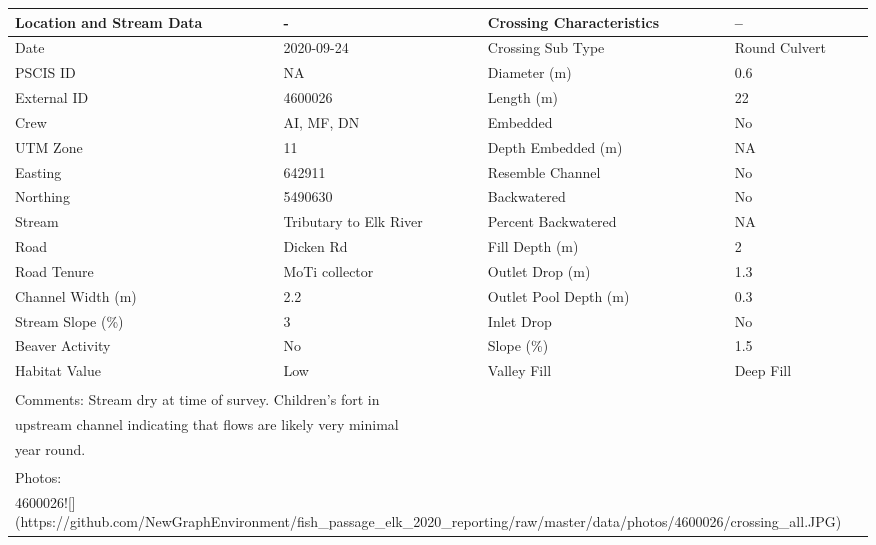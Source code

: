 \documentclass[
]{book}
\begin{document}
\begin{tabular}{l|l|l|l}
\hline
Location and Stream Data & - & Crossing Characteristics & --\\
\hline
Date & 2020-09-24 & Crossing Sub Type & Round Culvert\\
\hline
PSCIS ID & NA & Diameter (m) & 0.6\\
\hline
External ID & 4600026 & Length (m) & 22\\
\hline
Crew & AI, MF, DN & Embedded & No\\
\hline
UTM Zone & 11 & Depth Embedded (m) & NA\\
\hline
Easting & 642911 & Resemble Channel & No\\
\hline
Northing & 5490630 & Backwatered & No\\
\hline
Stream & Tributary to Elk River & Percent Backwatered & NA\\
\hline
Road & Dicken Rd & Fill Depth (m) & 2\\
\hline
Road Tenure & MoTi collector & Outlet Drop (m) & 1.3\\
\hline
Channel Width (m) & 2.2 & Outlet Pool Depth (m) & 0.3\\
\hline
Stream Slope (\%) & 3 & Inlet Drop & No\\
\hline
Beaver Activity & No & Slope (\%) & 1.5\\
\hline
Habitat Value & Low & Valley Fill & Deep Fill\\
\hline
\multicolumn{4}{l}{\textsuperscript{} Comments: Stream dry at time of survey.  Children’s fort in}\\
\multicolumn{4}{l}{upstream channel indicating that flows are likely very minimal}\\
\multicolumn{4}{l}{year round.}\\
\multicolumn{4}{l}{\textsuperscript{} Photos:}\\
\multicolumn{4}{l}{4600026![](https://github.com/NewGraphEnvironment/fish\_passage\_elk\_2020\_reporting/raw/master/data/photos/4600026/crossing\_all.JPG)}\\
\end{tabular}
\end{document}
